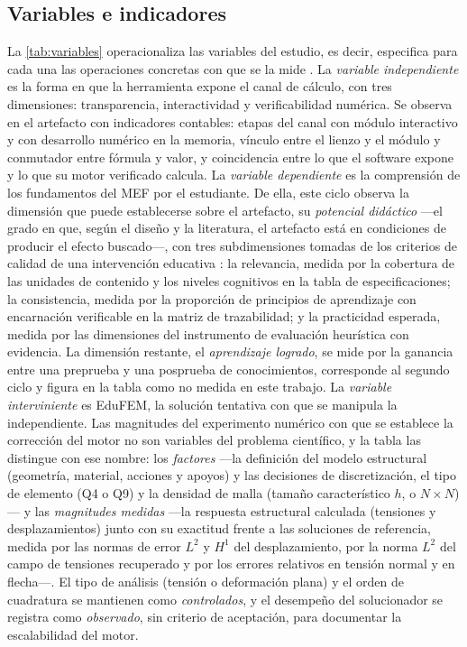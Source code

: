 \subsection{Variables e indicadores}
\label{sec:variables-met}

La \autoref{tab:variables} operacionaliza las variables del estudio, es decir, especifica para cada una las operaciones concretas con que se la mide \autocite[p.~137]{sampieri2018metodologia}. La \emph{variable independiente} es la forma en que la herramienta expone el canal de cálculo, con tres dimensiones: transparencia, interactividad y verificabilidad numérica. Se observa en el artefacto con indicadores contables: etapas del canal con módulo interactivo y con desarrollo numérico en la memoria, vínculo entre el lienzo y el módulo y conmutador entre fórmula y valor, y coincidencia entre lo que el software expone y lo que su motor verificado calcula. La \emph{variable dependiente} es la comprensión de los fundamentos del MEF por el estudiante. De ella, este ciclo observa la dimensión que puede establecerse sobre el artefacto, su \emph{potencial didáctico} —el grado en que, según el diseño y la literatura, el artefacto está en condiciones de producir el efecto buscado—, con tres subdimensiones tomadas de los criterios de calidad de una intervención educativa \autocite{nieveen2013formative}: la relevancia, medida por la cobertura de las unidades de contenido y los niveles cognitivos en la tabla de especificaciones; la consistencia, medida por la proporción de principios de aprendizaje con encarnación verificable en la matriz de trazabilidad; y la practicidad esperada, medida por las dimensiones del instrumento de evaluación heurística con evidencia. La dimensión restante, el \emph{aprendizaje logrado}, se mide por la ganancia entre una preprueba y una posprueba de conocimientos, corresponde al segundo ciclo y figura en la tabla como no medida en este trabajo. La \emph{variable interviniente} es EduFEM, la solución tentativa con que se manipula la independiente. Las magnitudes del experimento numérico con que se establece la corrección del motor no son variables del problema científico, y la tabla las distingue con ese nombre: los \emph{factores} —la definición del modelo estructural (geometría, material, acciones y apoyos) y las decisiones de discretización, el tipo de elemento (Q4 o Q9) y la densidad de malla (tamaño característico $h$, o $N\times N$)— y las \emph{magnitudes medidas} —la respuesta estructural calculada (tensiones y desplazamientos) junto con su exactitud frente a las soluciones de referencia, medida por las normas de error $L^2$ y $H^1$ del desplazamiento, por la norma $L^2$ del campo de tensiones recuperado y por los errores relativos en tensión normal y en flecha—. El tipo de análisis (tensión o deformación plana) y el orden de cuadratura se mantienen como \emph{controlados}, y el desempeño del solucionador se registra como \emph{observado}, sin criterio de aceptación, para documentar la escalabilidad del motor.

